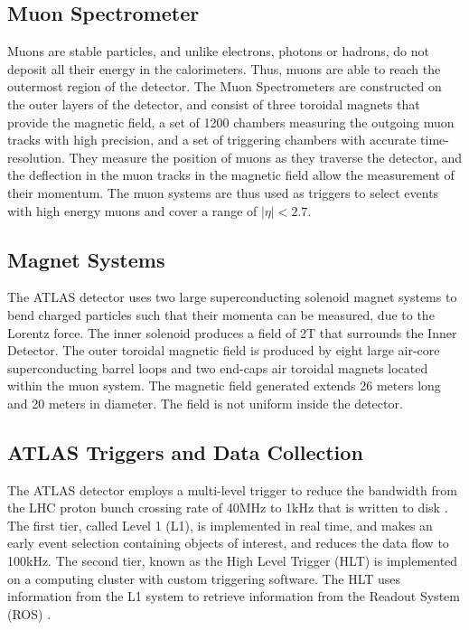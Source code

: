 \documentclass[12pt,a4paper,openright,twoside]{report}
\begin{document}
\subsection{Muon Spectrometer}
Muons are stable particles, and unlike electrons, photons or hadrons, do not deposit all their energy in the calorimeters. Thus, muons are able to reach the outermost region of the detector. The Muon Spectrometers are constructed on the outer layers of the detector, and consist of three toroidal magnets that provide the magnetic field, a set of 1200 chambers measuring the outgoing muon tracks with high precision, and a set of triggering chambers with accurate time-resolution. They measure the position of muons as they traverse the detector, and the deflection in the muon tracks in the magnetic field allow the measurement of their momentum. The muon systems are thus used as triggers to select events with high energy muons and cover a range of $|\eta|<2.7$. 

\subsection{Magnet Systems}
The ATLAS detector uses two large superconducting solenoid magnet systems to bend charged particles such that their momenta can be measured, due to the Lorentz force. The inner solenoid produces a field of 2T that surrounds the Inner Detector. The outer toroidal magnetic field is produced by eight large air-core superconducting barrel loops and two end-caps air toroidal magnets located within the muon system. The magnetic field generated extends 26 meters long and 20 meters in diameter. The field is not uniform inside the detector.

\subsection{ATLAS Triggers and Data Collection}
The ATLAS detector employs a multi-level trigger to reduce the bandwidth from the LHC proton bunch crossing rate of 40MHz to 1kHz that is written to disk \cite{trigger1,trigger2}. The first tier, called Level 1 (L1), is implemented in real time, and makes an early event selection containing objects of interest, and reduces the data flow to 100kHz. The second tier, known as the High Level Trigger (HLT) \cite{HLT} is implemented on a computing cluster with custom triggering software. The HLT uses information from the L1 system to retrieve information from the Readout System (ROS) \cite{ROS}.
\end{document}
